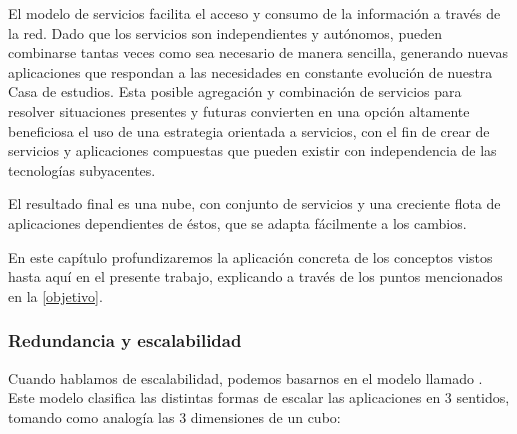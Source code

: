 El modelo de servicios facilita el acceso y consumo de la información a través de la red. Dado que los servicios son independientes y autónomos, pueden combinarse tantas veces como sea necesario de manera sencilla, generando nuevas aplicaciones que respondan a las necesidades en constante evolución de nuestra Casa de estudios. Esta posible agregación y combinación de servicios para resolver situaciones presentes y futuras convierten en una opción altamente beneficiosa el uso de una estrategia orientada a servicios, con el fin de crear de servicios y aplicaciones compuestas que pueden existir con independencia de las tecnologías subyacentes\cite{microsoft2006}.

El resultado final es una nube, con conjunto de servicios y una creciente flota de aplicaciones dependientes de éstos, que se adapta fácilmente a los cambios.

En este capítulo profundizaremos la aplicación concreta de los conceptos vistos hasta aquí en el presente trabajo, explicando a través de los puntos mencionados en la \autoref{objetivo}.


\subsubsection{Redundancia y escalabilidad}


Cuando hablamos de escalabilidad, podemos basarnos en el modelo llamado \cite{website:akfpartners-scale-cube}. Este modelo clasifica las distintas formas de escalar las aplicaciones en 3 sentidos, tomando como analogía las 3 dimensiones de un cubo:

